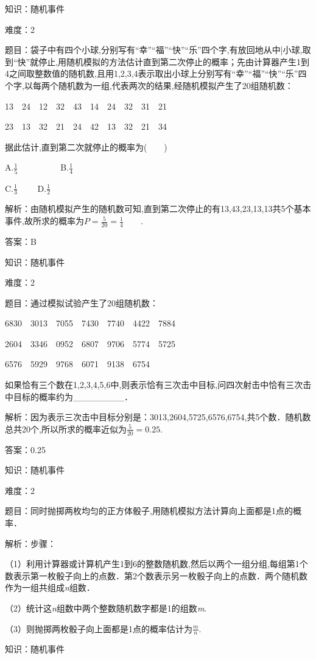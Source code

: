 \documentclass{article} %
\begin{document}
知识：随机事件

难度：2

题目：袋子中有四个小球,分别写有``幸''``福''``快''``乐''四个字,有放回地从中|小球,取到``快''就停止,用随机模拟的方法估计直到第二次停止的概率；先由计算器产生1到4之间取整数值的随机数,且用1,2,3,4表示取出小球上分别写有``幸''``福''``快''``乐''四个字,以每两个随机数为一组,代表两次的结果,经随机模拟产生了20组随机数：

13　24　12　32　43　14　24　32　31　21

23　13　32　21　24　42　13　32　21　34

据此估计,直到第二次就停止的概率为(　　)

A.$\frac{1}{5}$　　　　　B.$\frac{1}{4}$　　

C.$\frac{1}{3}$　　   D.$\frac{1}{2}$　　


解析：由随机模拟产生的随机数可知,直到第二次停止的有13,43,23,13,13共5个基本事件,故所求的概率为$P=\frac{5}{20}=\frac{1}{4}$　　.

答案：B

知识：随机事件

难度：2

题目：通过模拟试验产生了20组随机数：

6830　3013　7055　7430　7740　4422　7884

2604　3346　0952　6807　9706　5774　5725

6576　5929　9768　6071　9138　6754

如果恰有三个数在1,2,3,4,5,6中,则表示恰有三次击中目标,问四次射击中恰有三次击中目标的概率约为\_\_\_\_\_\_\_\_．

解析：因为表示三次击中目标分别是：3013,2604,5725,6576,6754,共5个数．随机数总共20个,所以所求的概率近似为$\frac{5}{20}=0.25$.

答案：0.25

知识：随机事件

难度：2

题目：同时抛掷两枚均匀的正方体骰子,用随机模拟方法计算向上面都是1点的概率．

解析：步骤：

（1）利用计算器或计算机产生1到6的整数随机数,然后以两个一组分组,每组第1个数表示第一枚骰子向上的点数．第2个数表示另一枚骰子向上的点数．两个随机数作为一组共组成\textit{n}组数．

（2）统计这\textit{n}组数中两个整数随机数字都是1的组数\textit{m}.

（3）则抛掷两枚骰子向上面都是1点的概率估计为$\frac{m}{n}$.

知识：随机事件
\end{document}

